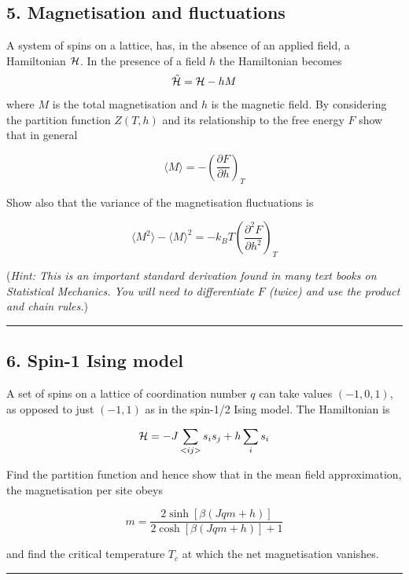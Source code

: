 \documentclass[
  letterpaper,
  enabledeprecatedfontcommands]{report}
\begin{document}
\subsection*{5. Magnetisation and
fluctuations}\label{magnetisation-and-fluctuations}

A system of spins on a lattice, has, in the absence of an applied field,
a Hamiltonian \({\cal H}\). In the presence of a field \(h\) the
Hamiltonian becomes \[
\tilde {\cal H}={\cal H}-hM
\] where \(M\) is the total magnetisation and \(h\) is the magnetic
field. By considering the partition function \(Z(T,h)\) and its
relationship to the free energy \(F\) show that in general

\[
\langle M \rangle=-\left(\frac{\partial F}{\partial h}\right)_T
\]

Show also that the variance of the magnetisation fluctuations is

\[\langle M^2\rangle-\langle M\rangle^2=-k_BT\left(\frac{\partial^2 F}{\partial h^2}\right)_T\]

(\emph{Hint: This is an important standard derivation found in many text
books on Statistical Mechanics. You will need to differentiate \(F\)
(twice) and use the product and chain rules.})

\begin{center}\rule{0.5\linewidth}{0.5pt}\end{center}

\subsection*{6. Spin-1 Ising model}\label{spin-1-ising-model}

A set of spins on a lattice of coordination number \(q\) can take values
\((-1,0,1)\), as opposed to just \((-1,1)\) as in the spin-1/2 Ising
model. The Hamiltonian is

\[{\cal H}=-J\sum_{<ij>}s_is_j + h\sum_i s_i\]

Find the partition function and hence show that in the mean field
approximation, the magnetisation per site obeys

\[m=\frac{2\sinh[\beta(Jqm+h)]}{2\cosh[\beta(Jqm+h)]+1}\]

and find the critical temperature \(T_c\) at which the net magnetisation
vanishes.

\begin{center}\rule{0.5\linewidth}{0.5pt}\end{center}
\end{document}
